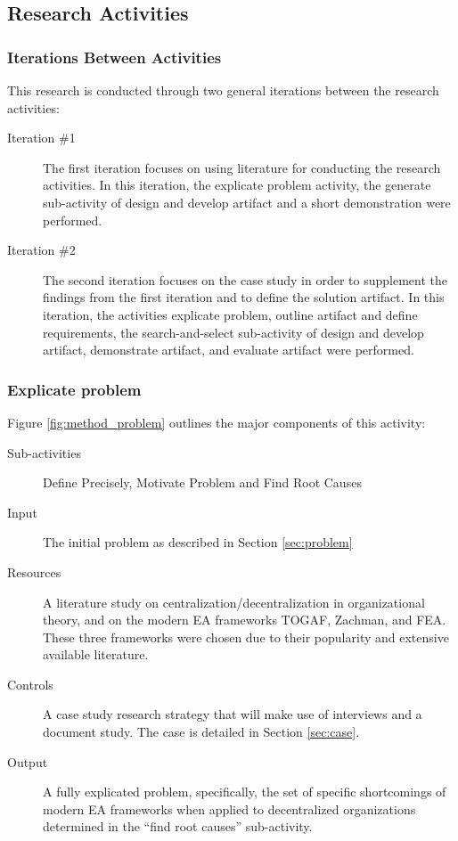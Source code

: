 \subsection{Research Activities}
\label{subsection:research_activities}

\subsubsection*{Iterations Between Activities}

This research is conducted through two general iterations between the research activities:
\begin{description}
  \item[Iteration \#1] The first iteration focuses on using literature for conducting the research activities. In this iteration, the explicate problem activity, the generate sub-activity of design and develop artifact and a short demonstration were performed. %
  \item[Iteration \#2] The second iteration focuses on the case study in order to supplement the findings from the first iteration and to define the solution artifact. In this iteration, the activities explicate problem, outline artifact and define requirements, the search-and-select sub-activity of design and develop artifact, demonstrate artifact, and evaluate artifact were performed.%
\end{description}

\subsubsection*{Explicate problem}

Figure \ref{fig:method_problem} outlines the major components of this activity:
\begin{description}
  \item[Sub-activities] Define Precisely, Motivate Problem and Find Root Causes~\cite[Ch. 5]{johannessonPerjons2012}
  \item[Input] The initial problem as described in Section \ref{sec:problem}
  \item[Resources] A literature study on centralization/decentralization in  organizational theory, and on the modern EA frameworks TOGAF, Zachman, and FEA. These three frameworks were chosen due to their popularity and extensive available literature.
  \item[Controls] A case study research strategy that will make use of interviews and a document study. The case is detailed in Section \ref{sec:case}. 
  \item[Output] A fully explicated problem, specifically, the set of specific shortcomings of modern EA frameworks when applied to decentralized organizations determined in the ``find root causes'' sub-activity.
\end{description}

